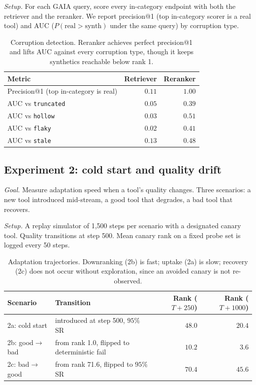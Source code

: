 \textit{Setup.} For each GAIA query, score every in-category endpoint with both the retriever and the reranker. We report precision@1 (top in-category scorer is a real tool) and AUC ($P(\text{real} > \text{synth})$ under the same query) by corruption type.

\begin{table}[h]
\centering
\small
\begin{tabular}{lrr}
\toprule
Metric & Retriever & Reranker \\
\midrule
Precision@1 (top in-category is real)   & $0.11$ & $\mathbf{1.00}$ \\
AUC vs \texttt{truncated}                & $0.05$ & $0.39$ \\
AUC vs \texttt{hollow}                   & $0.03$ & $0.51$ \\
AUC vs \texttt{flaky}                    & $0.02$ & $0.41$ \\
AUC vs \texttt{stale}                    & $0.13$ & $0.48$ \\
\bottomrule
\end{tabular}
\caption{Corruption detection. Reranker achieves perfect precision@1 and lifts AUC against every corruption type, though it keeps synthetics reachable below rank 1.}
\label{tab:exp1}
\end{table}

\subsection{Experiment 2: cold start and quality drift}
\label{sec:exp2}

\textit{Goal.} Measure adaptation speed when a tool's quality changes. Three scenarios: a new tool introduced mid-stream, a good tool that degrades, a bad tool that recovers.

\textit{Setup.} A replay simulator of 1{,}500 steps per scenario with a designated canary tool. Quality transitions at step 500. Mean canary rank on a fixed probe set is logged every 50 steps.

\begin{table}[h]
\centering
\small
\begin{tabular}{llrr}
\toprule
Scenario & Transition & Rank ($T{+}250$) & Rank ($T{+}1000$) \\
\midrule
2a: cold start    & introduced at step 500, $95\%$ SR             & $48.0$ & $20.4$ \\
2b: good$\to$bad  & from rank 1.0, flipped to deterministic fail  & $10.2$ & $3.6$ \\
2c: bad$\to$good  & from rank 71.6, flipped to $95\%$ SR          & $70.4$ & $45.6$ \\
\bottomrule
\end{tabular}
\caption{Adaptation trajectories. Downranking (2b) is fast; uptake (2a) is slow; recovery (2c) does not occur without exploration, since an avoided canary is not re-observed.}
\label{tab:exp2}
\end{table}

